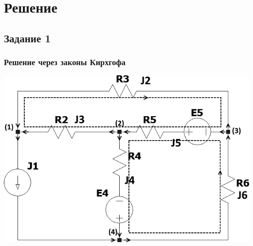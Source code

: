 \documentclass[12pt]{article}
\begin{document}
	\section*{Решение}
	\subsection*{Задание 1}
	\subsubsection*{Решение через законы Кирхгофа}
		\begin{center}
			{\includegraphics[scale=0.8]{2}}
			\par\bigskip
		\end{center}
\end{document}
